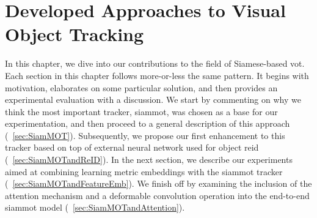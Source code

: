\chapter{Developed Approaches to Visual Object Tracking}
\label{chap:DevelopedVisualTrackingApproaches}

In this chapter, we dive into our contributions to the field of Siamese-based \gls{vot}. Each section in this chapter follows more-or-less the same pattern. It begins with motivation, elaborates on some particular solution, and then provides an experimental evaluation with a discussion. We start by commenting on why we think the most important tracker, \gls{siammot}, was chosen as a base for our experimentation, and then proceed to a general description of this approach (\sectiontext{}~\ref{sec:SiamMOT}). Subsequently, we propose our first enhancement to this tracker based on top of external neural network used for object \gls{reid} (\sectiontext{}~\ref{sec:SiamMOTandReID}). In the next section, we describe our experiments aimed at combining learning metric embeddings with the \gls{siammot} tracker (\sectiontext{}~\ref{sec:SiamMOTandFeatureEmb}). We finish off by examining the inclusion of the attention mechanism and a deformable convolution operation into the end-to-end \gls{siammot} model (\sectiontext{}~\ref{sec:SiamMOTandAttention}).






